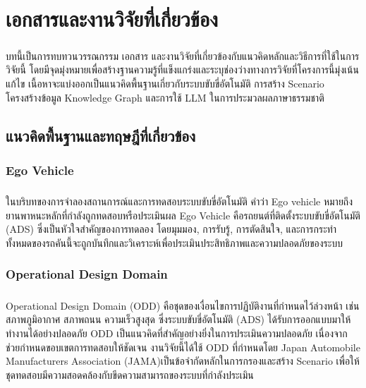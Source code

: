 \chapter{เอกสารและงานวิจัยที่เกี่ยวข้อง}

\paragraph{}
บทนี้เป็นการทบทวนวรรณกรรม เอกสาร และงานวิจัยที่เกี่ยวข้องกับแนวคิดหลักและวิธีการที่ใช้ในการวิจัยนี้ โดยมีจุดมุ่งหมายเพื่อสร้างฐานความรู้ที่แข็งแกร่งและระบุช่องว่างทางการวิจัยที่โครงการนี้มุ่งเน้นแก้ไข เนื้อหาจะแบ่งออกเป็นแนวคิดพื้นฐานเกี่ยวกับระบบขับขี่อัตโนมัติ การสร้าง Scenario โครงสร้างข้อมูล Knowledge Graph และการใช้ LLM ในการประมวลผลภาษาธรรมชาติ

\section{แนวคิดพื้นฐานและทฤษฎีที่เกี่ยวข้อง}

\subsection{Ego Vehicle}
\paragraph{}
ในบริบทของการจำลองสถานการณ์และการทดสอบระบบขับขี่อัตโนมัติ คำว่า Ego vehicle หมายถึง ยานพาหนะหลักที่กำลังถูกทดสอบหรือประเมินผล Ego Vehicle คือรถยนต์ที่ติดตั้งระบบขับขี่อัตโนมัติ (ADS) ซึ่งเป็นหัวใจสำคัญของการทดลอง โดยมุมมอง, การรับรู้, การตัดสินใจ, และการกระทำทั้งหมดของรถคันนี้จะถูกบันทึกและวิเคราะห์เพื่อประเมินประสิทธิภาพและความปลอดภัยของระบบ

\subsection{Operational Design Domain}\label{sec:ODD}
\paragraph{}
Operational Design Domain (ODD) คือชุดของเงื่อนไขการปฏิบัติงานที่กำหนดไว้ล่วงหน้า เช่น สภาพภูมิอากาศ สภาพถนน ความเร็วสูงสุด ซึ่งระบบขับขี่อัตโนมัติ (ADS) ได้รับการออกแบบมาให้ทำงานได้อย่างปลอดภัย ODD เป็นแนวคิดที่สำคัญอย่างยิ่งในการประเมินความปลอดภัย เนื่องจากช่วยกำหนดขอบเขตการทดสอบให้ชัดเจน งานวิจัยนี้ได้ใช้ ODD ที่กำหนดโดย Japan Automobile Manufacturers Association (JAMA)เป็นข้อจำกัดหลักในการกรองและสร้าง Scenario เพื่อให้ชุดทดสอบมีความสอดคล้องกับขีดความสามารถของระบบที่กำลังประเมิน

